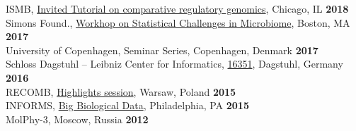 \documentclass[margin,line,letterpaper]{resume}
\begin{document}
\begin{resume}
        ISMB, \href{https://www.iscb.org/ismb2018-program/ismb2018-tutorials#am4}{Invited Tutorial on comparative regulatory genomics}, Chicago, IL 
        \hfill \textbf{2018}\\
        Simons Found., \href{https://indico.flatironinstitute.org/category/17/attachments/30/35/General_Agenda_SACMDA2_.pdf}{Workhop on Statistical Challenges in Microbiome}, Boston, MA %
         \hfill \textbf{2017}\\
         University of Copenhagen, Seminar Series, Copenhagen, Denmark  \hfill \textbf{2017}\\
         Schloss Dagstuhl -- Leibniz Center for Informatics, \href{https://www.dagstuhl.de/no_cache/en/program/calendar/partlist/?semnr=16351&SUOG=}{16351}, Dagstuhl, Germany  \hfill \textbf{2016}\\
         RECOMB, \href{http://recomb2015.mimuw.edu.pl/node/6.html}{Highlights session}, Warsaw, Poland %
         \hfill \textbf{2015}\\
         INFORMS, \href{http://meetings2.informs.org/wordpress/philadelphia/files/2015/10/Monday.pdf}{Big Biological Data}, Philadelphia, PA %
         \hfill \textbf{2015}\\
         MolPhy-3, Moscow, Russia %
         \hfill \textbf{2012}\vspace{1mm}

\end{resume}
\end{document}

